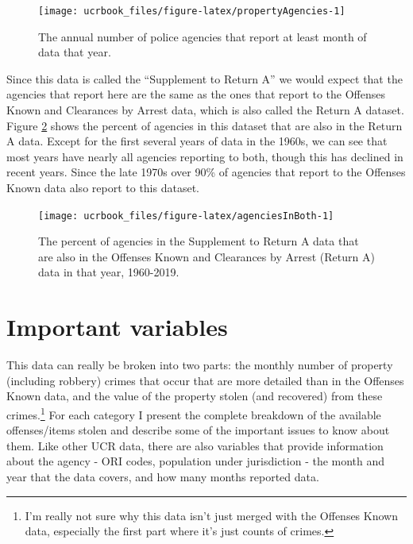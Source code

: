 \documentclass[
  12pt,
  openany]{book}
\begin{document}
\begin{figure}

{\centering \texttt{[image: ucrbook\_files/figure-latex/propertyAgencies-1]} 

}

\caption{The annual number of police agencies that report at least month of data that year.}\label{fig:propertyAgencies}
\end{figure}

Since this data is called the ``Supplement to Return A'' we would expect that the agencies that report here are the same as the ones that report to the Offenses Known and Clearances by Arrest data, which is also called the Return A dataset. Figure \ref{fig:agenciesInBoth} shows the percent of agencies in this dataset that are also in the Return A data. Except for the first several years of data in the 1960s, we can see that most years have nearly all agencies reporting to both, though this has declined in recent years. Since the late 1970s over 90\% of agencies that report to the Offenses Known data also report to this dataset.

\begin{figure}

{\centering \texttt{[image: ucrbook\_files/figure-latex/agenciesInBoth-1]} 

}

\caption{The percent of agencies in the Supplement to Return A data that are also in the Offenses Known and Clearances by Arrest (Return A) data in that year, 1960-2019.}\label{fig:agenciesInBoth}
\end{figure}

\hypertarget{important-variables-1}{%
\section{Important variables}\label{important-variables-1}}

This data can really be broken into two parts: the monthly number of property (including robbery) crimes that occur that are more detailed than in the Offenses Known data, and the value of the property stolen (and recovered) from these crimes.\footnote{I'm really not sure why this data isn't just merged with the Offenses Known data, especially the first part where it's just counts of crimes.} For each category I present the complete breakdown of the available offenses/items stolen and describe some of the important issues to know about them. Like other UCR data, there are also variables that provide information about the agency - ORI codes, population under jurisdiction - the month and year that the data covers, and how many months reported data.
\end{document}
